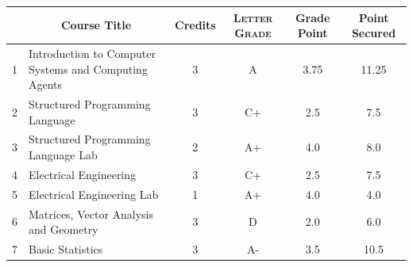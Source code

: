 \documentclass[11pt]{article}
\newcommand*{\numtwo}[1]{\pgfmathprintnumber[
                    fixed, precision=2, fixed zerofill=true]{#1}}
\begin{document}
                \begin{center}
                    \renewcommand{\arraystretch}{1.08}
                    
                \begin{tabular}{|c|l|c|>{\scshape}c|c|c|}
                \hline  \rule[-1ex]{0pt}{3.5ex} {\centering{\bf Course Code}} &  \multicolumn{1}{c|}{\textbf{Course Title}}  & {\bf Credits} & {\bf Letter Grade} & {\bf Grade Point} & {\bf Point Secured}  \\ 
                \hline   1 &  Introduction to Computer Systems and Computing Agents		 & 3 & A & 3.75 & 11.25 \\ %
                \hline   2 &  Structured Programming Language		 & 3 & C+ & 2.5 & 7.5 \\ %
                \hline   3 &  Structured Programming Language Lab		 & 2 & A+ & 4.0 & 8.0 \\ %
                \hline   4 &  Electrical Engineering		 & 3 & C+ & 2.5 & 7.5 \\ %
                \hline   5 &  Electrical Engineering Lab		 & 1 & A+ & 4.0 & 4.0 \\ %
                \hline   6 &  Matrices, Vector Analysis and Geometry		 & 3 & D & 2.0 & 6.0 \\ %
                \hline   7 &  Basic Statistics		 & 3 & A- & 3.5 & 10.5 \\ %

\hline                %
                \end{tabular}
                \end{center}
                \renewcommand{\arraystretch}{1.03}
\end{document}
